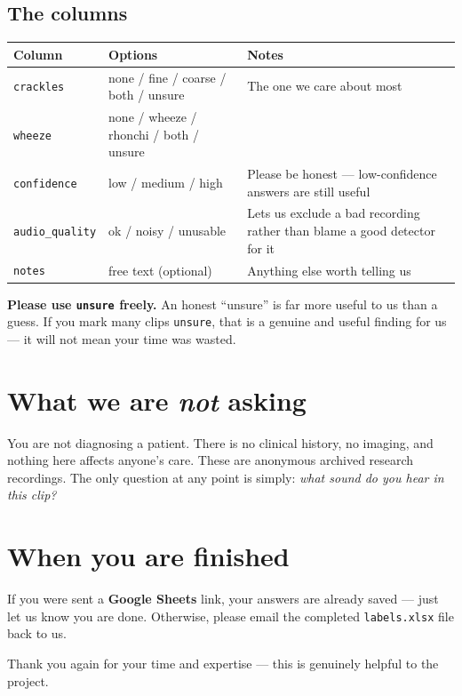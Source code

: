 \documentclass[11pt]{article}
\begin{document}
\subsection*{The columns}

\begin{center}
\renewcommand{\arraystretch}{1.15}
\begin{tabular}{@{}L{2.7cm}L{5.6cm}L{5.5cm}@{}}
\toprule
\textbf{Column} & \textbf{Options} & \textbf{Notes} \\
\midrule
\texttt{crackles} & none / fine / coarse / both / unsure & The one we care about most \\
\texttt{wheeze} & none / wheeze / rhonchi / both / unsure & \\
\texttt{confidence} & low / medium / high & Please be honest --- low-confidence answers are
   still useful \\
\texttt{audio\_quality} & ok / noisy / unusable & Lets us exclude a bad recording rather than
   blame a good detector for it \\
\texttt{notes} & free text (optional) & Anything else worth telling us \\
\bottomrule
\end{tabular}
\end{center}

\noindent\textbf{Please use \texttt{unsure} freely.} An honest ``unsure'' is far more useful to us
than a guess. If you mark many clips \texttt{unsure}, that is a genuine and useful finding for
us --- it will not mean your time was wasted.

\section*{What we are \emph{not} asking}
You are not diagnosing a patient. There is no clinical history, no imaging, and nothing here
affects anyone's care. These are anonymous archived research recordings. The only question at any
point is simply: \emph{what sound do you hear in this clip?}

\section*{When you are finished}
If you were sent a \textbf{Google Sheets} link, your answers are already saved --- just let us
know you are done. Otherwise, please email the completed \texttt{labels.xlsx} file back to us.

\vspace{6pt}
\noindent Thank you again for your time and expertise --- this is genuinely helpful to the
project.
\end{document}
